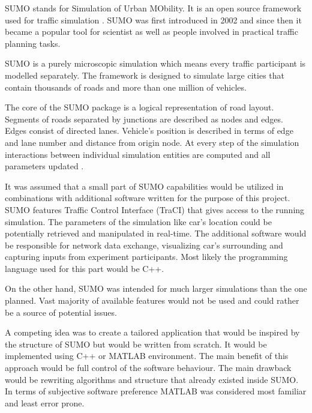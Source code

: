 \documentclass[11pt,english]{article}
\begin{document}

SUMO stands for Simulation of Urban MObility. It is an open source framework used for traffic simulation \citep{krajzewicz2002sumo}. SUMO was first introduced in 2002 and since then it became a popular tool for scientist as well as people involved in practical traffic planning tasks. 
\par
SUMO is a purely microscopic simulation which means every traffic participant is modelled separately. The framework is designed to simulate large cities that contain thousands of roads and more than one million of vehicles.
\par
The core of the SUMO package is a logical representation of road layout. Segments of roads separated by junctions are described as nodes and edges. Edges consist of directed lanes. Vehicle's position is described in terms of edge and lane number and distance from origin node. At every step of the simulation interactions between individual simulation entities are computed and all parameters updated 
\citep{krajzewicz2002sumo}.
\par

It was assumed that a small part of SUMO capabilities would be utilized in combinations with additional software written for the purpose of this project. SUMO features  Traffic Control Interface (TraCI) \citep{sumo2} that gives access to the running simulation. The parameters of the simulation like car's location could be potentially retrieved and manipulated in real-time. The additional software would be responsible for network data exchange, visualizing car's surrounding and capturing inputs from experiment participants. Most likely the programming language used for this part would be C++. 
\par
On the other hand, SUMO was intended for much larger simulations than the one planned. Vast majority of available features would not be used and could rather be a source of potential issues. 




\par


A competing idea was to create a tailored application that would be inspired by the structure of SUMO but would be written from scratch. It would be implemented using C++ or MATLAB environment. The main benefit of this approach would be full control of the software behaviour. The main drawback would be rewriting algorithms and structure that already existed inside SUMO. In terms of subjective software preference MATLAB was considered most familiar and least error prone.  
\end{document}
